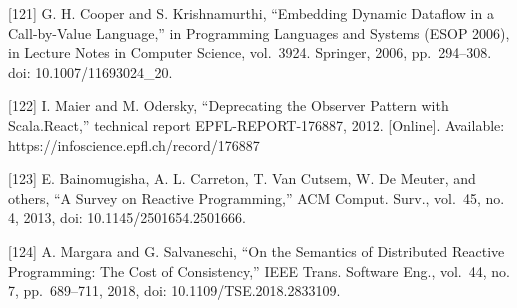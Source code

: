 {[}121{]} G. H. Cooper and S. Krishnamurthi, ``Embedding Dynamic Dataflow in a
Call-by-Value Language,'' in Programming Languages and Systems (ESOP 2006), in
Lecture Notes in Computer Science, vol.~3924. Springer, 2006, pp.~294--308. doi:
10.1007/11693024\_20.

{[}122{]} I. Maier and M. Odersky, ``Deprecating the Observer Pattern with
Scala.React,'' technical report EPFL-REPORT-176887, 2012. {[}Online{]}. Available:
https://infoscience.epfl.ch/record/176887

{[}123{]} E. Bainomugisha, A. L. Carreton, T. Van Cutsem, W. De Meuter, and others,
``A Survey on Reactive Programming,'' ACM Comput. Surv., vol.~45, no. 4, 2013, doi:
10.1145/2501654.2501666.

{[}124{]} A. Margara and G. Salvaneschi, ``On the Semantics of Distributed Reactive
Programming: The Cost of Consistency,'' IEEE Trans. Software Eng., vol.~44, no. 7,
pp.~689--711, 2018, doi: 10.1109/TSE.2018.2833109.


